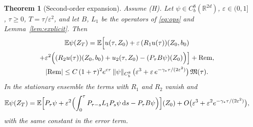 \documentclass[11pt]{article}
\newcommand{\dd}{\mathrm{d}}
\newcommand{\E}{\mathbb{E}}
\newcommand{\eps}{\varepsilon}
\newcommand{\fM}{\mathfrak{M}}
\newcommand{\R}{\mathbb{R}}
\newcommand{\nrm}[2]{\|#1\|_{#2}}
\newtheorem{theorem}{Theorem}
\theoremstyle{remark}
\begin{document}
\begin{theorem}[Second-order expansion]\label{thm:second}
Assume (H). Let $\psi\in C_b^8(\R^{2d})$, $\eps\in(0,1]$, $\tau\ge0$,
$T=\tau/\eps^2$, and let $B$, $L_1$ be the operators of \eqref{eq:ops} and
Lemma~\ref{lem:explicit}. Then
\begin{multline*}
  \E\psi(Z_T)=\E\Bigl[u(\tau,Z_0)+\eps\,(R_1u(\tau))(Z_0,b_0)\\
   +\eps^2\Bigl((R_2u(\tau))(Z_0,b_0)+u_2(\tau,Z_0)-(P_\tau B\psi)(Z_0)\Bigr)\Bigr]
   +\mathrm{Rem},\\
  |\mathrm{Rem}|\le C\,(1+\tau)^2e^{c\tau}\,\nrm{\psi}{C_b^8}\,
  \bigl(\eps^3+\eps\,e^{-\gamma_*\tau/(2\eps^2)}\bigr)\,\fM(\tau).
\end{multline*}
In the stationary ensemble the terms with $R_1$ and $R_2$ vanish and
\begin{equation}
  \E\psi(Z_T)=\E\Bigl[P_\tau\psi
    +\eps^2\Bigl(\int_0^\tau P_{\tau-s}L_1P_s\psi\,\dd s-P_\tau B\psi\Bigr)\Bigr](Z_0)
  +O\bigl(\eps^3+\eps^2e^{-\gamma_*\tau/(2\eps^2)}\bigr),
  \label{eq:second}
\end{equation}
with the same constant in the error term.
\end{theorem}
\end{document}
